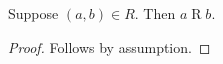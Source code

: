 \begin{proposition}\label{exact_relation_expression}
    Suppose $(a,b)\in R$.
    Then $a\mathrel{R}b$.
\end{proposition}
\begin{proof}
    Follows by assumption.
\end{proof}
